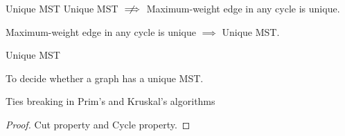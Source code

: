 \begin{frame}{}
  \begin{exampleblock}{Unique MST }
    Unique MST $\centernot\implies$ Maximum-weight edge in any cycle is unique.
  \end{exampleblock}

  \pause

  \pause
  \begin{theorem}[Conjecture]
    Maximum-weight edge in any cycle is unique $\implies$ Unique MST.
  \end{theorem}

  \pause
\end{frame}

\begin{frame}{}
  \begin{exampleblock}{Unique MST }
    \centerline{To decide whether a graph has a unique MST.}
  \end{exampleblock}

  \pause
  \vspace{0.80cm}
  \centerline{Ties breaking in Prim's and Kruskal's algorithms}

  \pause
  \vspace{0.50cm}
  \begin{proof}
    \centerline{Cut property and Cycle property.}
  \end{proof}
\end{frame}
